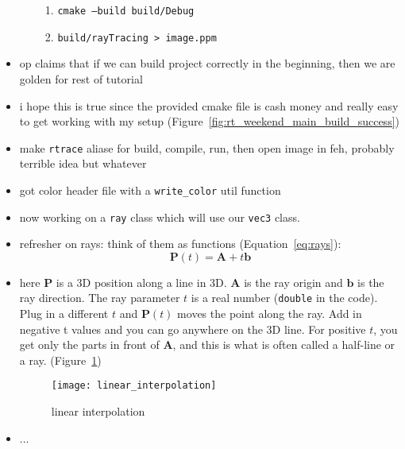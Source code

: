 \begin{itemize}
\begin{itemize}
\begin{enumerate}
                    \item \texttt{cmake --build build/Debug} 
                    \item \texttt{build/rayTracing > image.ppm} 
                \end{enumerate}
        \end{itemize}
    \item op claims that if we can build project correctly in the beginning,
        then we are golden for rest of tutorial
    \item i hope this is true since the provided cmake file is cash money and
        really easy to get working with my setup
        (Figure~\ref{fig:rt_weekend_main_build_success})
    \item make \texttt{rtrace} aliase for build, compile, run, then open image
        in feh, probably terrible idea but whatever 
    \item got color header file with a \texttt{write_color} util function
    \item now working on a \texttt{ray} class which will use our \texttt{vec3} 
        class.
    \item refresher on rays: think of them as functions 
        (Equation~\ref{eq:rays}):
        \begin{equation}
            \mathbf{P}(t) = \mathbf{A} + t\mathbf{b}
            \label{eq:rays}
        \end{equation}
    \item here $\mathbf{P}$ is a 3D position along a line in 3D. $\mathbf{A}$ is
        the ray origin and $\mathbf{b}$ is the ray direction. The ray parameter
        $t$ is a real number (\texttt{double} in the code). Plug in a different
        $t$ and $\mathbf{P}(t)$ moves the point along the ray. Add in negative t
        values and you can go anywhere on the 3D line. For positive $t$, you get
        only the parts in front of $\mathbf{A}$, and this is what is often
        called a half-line or a ray. (Figure~\ref{fig:linear_interpolation}) 
        \begin{figure}[ht]
            \centering
            \texttt{[image: linear\_interpolation]}
            \captionsetup{labelfont=bf, textfont=it}
            \caption{linear interpolation}
            \label{fig:linear_interpolation}
        \end{figure}
    \item  ...
\end{itemize}
